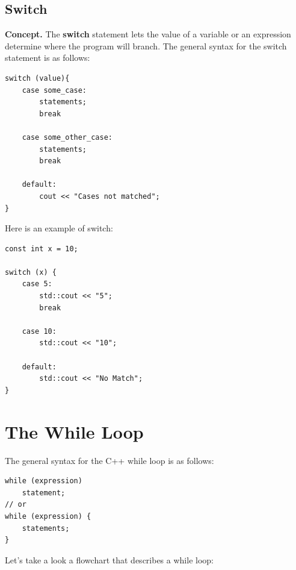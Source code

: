 \documentclass{report}
\begin{document}
    \subsection{Switch}
    \bigbreak \noindent 
    \textbf{Concept.} The \textbf{switch} statement lets the value of a variable or an expression determine where the program will branch.
    \bigbreak \noindent 
    The general syntax for the switch statement is as follows:
    \bigbreak \noindent 
    \sepline
    \begin{verbatim}
switch (value){
    case some_case:
        statements;
        break

    case some_other_case:
        statements;
        break

    default:
        cout << "Cases not matched";
}
    \end{verbatim}
    \sepline
    \bigbreak \noindent 
    \bigbreak \noindent 
    Here is an example of switch:
    \bigbreak \noindent 
    \sepline
    \begin{verbatim}
const int x = 10;

switch (x) {
    case 5:
        std::cout << "5";
        break

    case 10:
        std::cout << "10";

    default:
        std::cout << "No Match";
}
    \end{verbatim}
    \sepline
    \bigbreak \noindent 

    \pagebreak \bigbreak \noindent 
    \section{\LARGE The While Loop}
    \bigbreak \noindent 
    The general syntax for the C++ while loop is as follows:
    \bigbreak \noindent 
    \sepline
    \begin{verbatim}
while (expression)
    statement;
// or
while (expression) {
    statements;
}
    \end{verbatim}
    \sepline
    \bigbreak \noindent 
    \begin{minipage}[]{0.47\textwidth}
        Let's take a look a flowchart that describes a while loop:
    \end{minipage}
    \begin{minipage}[]{0.47\textwidth}
    \end{minipage}
    \bigbreak \noindent 
\end{document}
